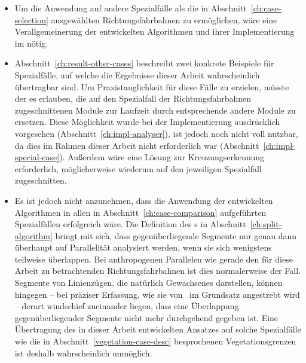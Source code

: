 \documentclass[../main/thesis.tex]{subfiles}
\begin{document}
\begin{itemize}

\item
Um die Anwendung auf andere Spezialfälle als die in Abschnitt~\ref{ch:case-selection} ausgewählten Richtungsfahrbahnen zu ermöglichen, wäre eine Verallgemeinerung der entwickelten Algorithmen und ihrer Implementierung im  nötig.

\item
Abschnitt~\ref{ch:result-other-cases} beschreibt zwei konkrete Beispiele für Spezialfälle, auf welche die Ergebnisse dieser Arbeit wahrscheinlich übertragbar sind.
Um Praxistauglichkeit für diese Fälle zu erzielen, müsste der  es erlauben, die auf den Spezialfall der Richtungsfahrbahnen zugeschnittenen Module zur Laufzeit durch entsprechende andere Module zu ersetzen.
Diese Möglichkeit wurde bei der Implementierung ausdrücklich vorgesehen (Abschnitt~\ref{ch:impl-analyser}), ist jedoch noch nicht voll nutzbar, da dies im Rahmen dieser Arbeit nicht erforderlich war (Abschnitt~\ref{ch:impl-special-case}).
Außerdem wäre eine Lösung zur Kreuzungserkennung erforderlich, möglicherweise wiederum auf den jeweiligen Spezialfall zugeschnitten.

\item
Es ist jedoch nicht anzunehmen, dass die Anwendung der entwickelten Algorithmen in allen in Abschnitt~\ref{ch:case-comparison} aufgeführten Spezialfällen erfolgreich wäre.
Die Definition des s in Abschnitt~\ref{ch:split-algorithm} bringt mit sich, dass gegenüberliegende Segmente nur genau dann überhaupt auf Parallelität analysiert werden, wenn sie sich wenigstens teilweise überlappen.
Bei anthropogenen Parallelen wie gerade den für diese Arbeit zu betrachtenden Richtungsfahrbahnen ist dies normalerweise der Fall.
Segmente von Linienzügen, die natürlich Gewachsenes darstellen, können hingegen -- bei präziser Erfassung, wie sie von \osm\ im Grundsatz angestrebt wird -- derart windschief zueinander liegen, dass eine Überlappung gegenüberliegender Segmente nicht mehr durchgehend gegeben ist.
Eine Übertragung des in dieser Arbeit entwickelten Ansatzes auf solche Spezialfälle wie die in Abschnitt~\ref{vegetation-case-desc} besprochenen Vegetationsgrenzen ist deshalb wahrscheinlich unmöglich.

\end{itemize}

\end{document}
